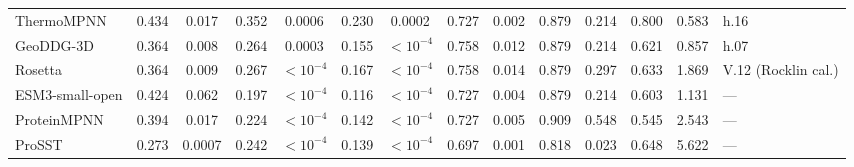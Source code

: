 \begin{table}[H]
{\begin{tabular}{lccccccccccccl}
ThermoMPNN & 0.434 & 0.017 & 0.352 & 0.0006 & 0.230 & 0.0002 & 0.727 & 0.002 & 0.879 & 0.214 & 0.800 & 0.583 & h.16 \\
GeoDDG-3D & 0.364 & 0.008 & 0.264 & 0.0003 & 0.155 & $<10^{-4}$ & 0.758 & 0.012 & 0.879 & 0.214 & 0.621 & 0.857 & h.07 \\
Rosetta & 0.364 & 0.009 & 0.267 & $<10^{-4}$ & 0.167 & $<10^{-4}$ & 0.758 & 0.014 & 0.879 & 0.297 & 0.633 & 1.869 & V.12 (Rocklin cal.) \\
ESM3-small-open & 0.424 & 0.062 & 0.197 & $<10^{-4}$ & 0.116 & $<10^{-4}$ & 0.727 & 0.004 & 0.879 & 0.214 & 0.603 & 1.131 & --- \\
ProteinMPNN & 0.394 & 0.017 & 0.224 & $<10^{-4}$ & 0.142 & $<10^{-4}$ & 0.727 & 0.005 & 0.909 & 0.548 & 0.545 & 2.543 & --- \\
ProSST & 0.273 & 0.0007 & 0.242 & $<10^{-4}$ & 0.139 & $<10^{-4}$ & 0.697 & 0.001 & 0.818 & 0.023 & 0.648 & 5.622 & --- \\
\bottomrule
\end{tabular}
}
\end{table}

